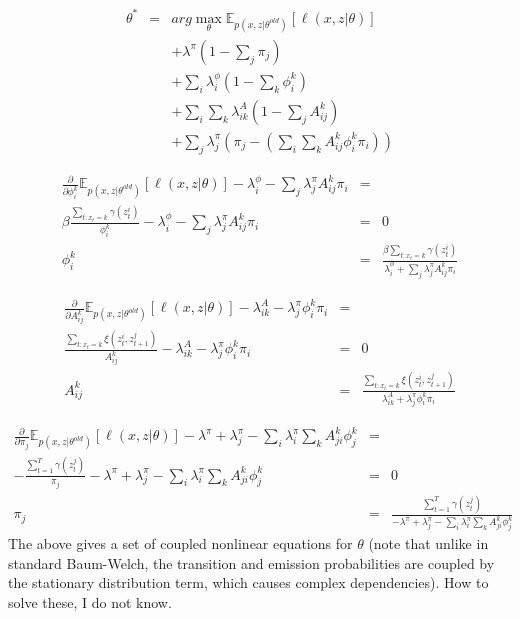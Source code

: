 \documentclass[11pt]{article}
\begin{document}
\begin{eqnarray*}
\theta^* & = & arg \max_\theta \mathbb{E}_{p(x,z|\theta^{old})}[\ell(x,z|\theta)] \\
& & + \lambda^\pi \left(1 - \sum_j \pi_j \right) \\
& & + \sum_i\lambda^\phi_i \left(1 - \sum_k\phi_i^k\right) \\
& & + \sum_i\sum_k\lambda^A_{ik}\left(1-\sum_j A^k_{ij}\right) \\
& & + \sum_j \lambda^\pi_j\left(\pi_j - \left(\sum_i \sum_k A^k_{ij}\phi^k_i\pi_i\right)\right)
\end{eqnarray*}

\begin{eqnarray}
\frac{\partial}{\partial\phi^k_i} \mathbb{E}_{p(x,z|\theta^{old})}[\ell(x,z|\theta)] - \lambda^\phi_i - \sum_j \lambda^\pi_j A^k_{ij}\pi_i & = & \\
\beta \frac{\sum_{t:x_t = k}\gamma(z_t^i)}{\phi_i^k}  - \lambda^\phi_i  - \sum_j \lambda^\pi_j A^k_{ij}\pi_i & = & 0 \\
\phi^k_i & = & \frac{\beta \sum_{t:x_t = k} \gamma(z_t^i)}{\lambda^\phi_i + \sum_j \lambda^\pi_j A^k_{ij}\pi_i}
\end{eqnarray}

\begin{eqnarray}
\frac{\partial}{\partial A^k_{ij}} \mathbb{E}_{p(x,z|\theta^{old})}[\ell(x,z|\theta)] - \lambda^A_{ik} - \lambda^\pi_j \phi^k_i\pi_i & = & \\
\frac{\sum_{t:x_t=k}\xi(z_t^i,z_{t+1}^j)}{A^k_{ij}} - \lambda^A_{ik} - \lambda^\pi_j \phi^k_i\pi_i & = & 0 \\
A^k_{ij} & = & \frac{\sum_{t:x_t=k}\xi(z^i_t,z^j_{t+1})}{\lambda^A_{ik} + \lambda^\pi_j \phi^k_i \pi_i}
\end{eqnarray}

\begin{eqnarray}
\frac{\partial}{\partial \pi_j} \mathbb{E}_{p(x,z|\theta^{old})}[\ell(x,z|\theta)] - \lambda^\pi + \lambda^\pi_j - \sum_i \lambda^\pi_i\sum_k A^k_{ji}\phi^k_j & = & \\
- \frac{\sum_{t=1}^T\gamma(z^j_t)}{\pi_j} - \lambda^\pi + \lambda^\pi_j - \sum_i \lambda^\pi_i\sum_k A^k_{ji}\phi^k_j & = & 0 \\
\pi_j & = & \frac{\sum_{t=1}^T \gamma(z_t^j)}{-\lambda^\pi + \lambda^\pi_j - \sum_i\lambda^\pi_i \sum_k A^k_{ji}\phi^k_j}
\end{eqnarray}
The above gives a set of coupled nonlinear equations for $\theta$ (note that unlike in standard Baum-Welch, the transition and emission probabilities are coupled by the stationary distribution term, which causes complex dependencies).  How to solve these, I do not know.
\end{document}
